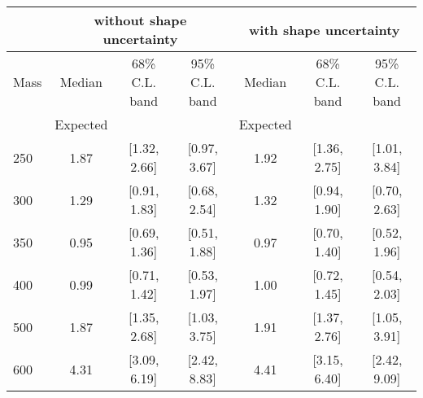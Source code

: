 \begin{table}[!ht]
\begin{center}
{\normalsize
\begin{tabular}{|l|c|c|c|c|c|c|}
\hline
      &  \multicolumn{3}{c|}{ without shape uncertainty} &\multicolumn{3}{c|}{ with shape uncertainty} \\
\hline
Mass  &  Median      &     68\% C.L. band &  95\% C.L. band &  Median	   &	 68\% C.L. band &  95\% C.L. band\\
      &  Expected    &                    &                 &  Expected    &			&		 \\
\hline
250 & 1.87 & [1.32, 2.66] & [0.97, 3.67] & 1.92 & [1.36, 2.75] & [1.01, 3.84] \\
300 & 1.29 & [0.91, 1.83] & [0.68, 2.54] & 1.32 & [0.94, 1.90] & [0.70, 2.63] \\
350 & 0.95 & [0.69, 1.36] & [0.51, 1.88] & 0.97 & [0.70, 1.40] & [0.52, 1.96] \\
400 & 0.99 & [0.71, 1.42] & [0.53, 1.97] & 1.00 & [0.72, 1.45] & [0.54, 2.03] \\
500 & 1.87 & [1.35, 2.68] & [1.03, 3.75] & 1.91 & [1.37, 2.76] & [1.05, 3.91] \\
600 & 4.31 & [3.09, 6.19] & [2.42, 8.83] & 4.41 & [3.15, 6.40] & [2.42, 9.09] \\


\end{tabular}}
\end{center}
\end{table}
